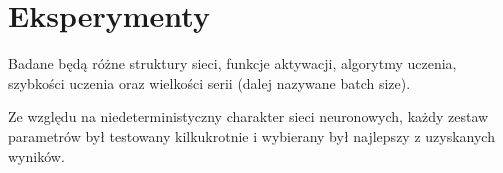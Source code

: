 \chapter{Eksperymenty}
Badane będą różne  struktury sieci, funkcje aktywacji, algorytmy uczenia, szybkości uczenia oraz wielkości serii (dalej nazywane batch size).

Ze względu na niedeterministyczny charakter sieci neuronowych, każdy zestaw parametrów był testowany kilkukrotnie i wybierany był najlepszy z uzyskanych wyników.





